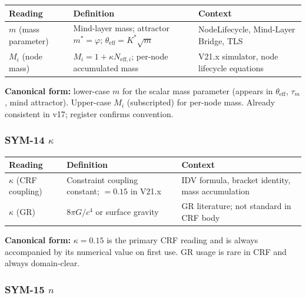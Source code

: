 \documentclass[12pt, a4paper]{article}
\begin{document}
\begin{yellowbox}[title={SYM-13 \textmd{---} $m$ vs $M_i$ \textmd{(mass parameter vs node mass)}}]
\renewcommand{\arraystretch}{1.35}
\begin{tabular}{p{2.8cm} p{4.5cm} p{4.5cm}}
\toprule
\textbf{Reading} & \textbf{Definition} & \textbf{Context}\\
\midrule
$m$ (mass parameter) &
  Mind-layer mass; attractor $m^* = \varphi$;
  $\theta_{\text{eff}} = K^*\sqrt{m}$ &
  NodeLifecycle, Mind-Layer Bridge, TLS\\
$M_i$ (node mass) &
  $M_i = 1 + \kappa N_{\text{eff},i}$; per-node accumulated mass &
  V21.x simulator, node lifecycle equations\\
\bottomrule
\end{tabular}

\medskip
\textbf{Canonical form:} lower-case $m$ for the scalar mass parameter
(appears in $\theta_{\text{eff}}$, $\tau_m$, mind attractor).
Upper-case $M_i$ (subscripted) for per-node mass. Already consistent
in v17; register confirms convention.
\end{yellowbox}

\subsubsection*{SYM-14 \quad $\kappa$}

\begin{yellowbox}[title={SYM-14 \textmd{---} $\kappa$ \textmd{(two readings)}}]
\renewcommand{\arraystretch}{1.35}
\begin{tabular}{p{2.8cm} p{4.5cm} p{4.5cm}}
\toprule
\textbf{Reading} & \textbf{Definition} & \textbf{Context}\\
\midrule
$\kappa$ (CRF coupling) &
  Constraint coupling constant; $= 0.15$ in V21.x &
  IDV formula, bracket identity, mass accumulation\\
$\kappa$ (GR) &
  $8\pi G/c^4$ or surface gravity &
  GR literature; not standard in CRF body\\
\bottomrule
\end{tabular}

\medskip
\textbf{Canonical form:} $\kappa = 0.15$ is the primary CRF reading
and is always accompanied by its numerical value on first use.
GR usage is rare in CRF and always domain-clear.
\end{yellowbox}

\subsubsection*{SYM-15 \quad $n$}
\end{document}

